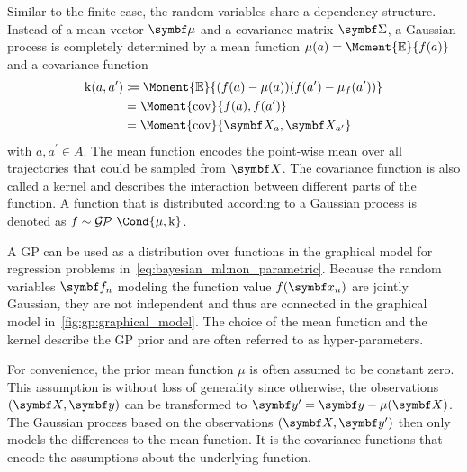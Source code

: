 Similar to the finite case, the random variables share a dependency structure.
Instead of a mean vector $\mat{\mu}$ and a covariance matrix $\mat{\Sigma}$, a Gaussian process is completely determined by a mean function $\mu(a) = \Moment{\E}{f(a)}$ and a covariance function
\begin{equation}
    \begin{split}
        \K(a, a^\prime) &\coloneqq \Moment{\E}{(f(a) - \mu(a))(f(a^\prime) - \mu_f(a^\prime))} \\
        &= \Moment{\cov}{f(a), f(a^\prime)} \\
        &= \Moment{\cov}{\rv{X}_a, \rv{X}_{a^\prime}}
    \end{split}
\end{equation}
with $a, a^\prime \in A$.
The mean function encodes the point-wise mean over all trajectories that could be sampled from $\rv{X}$.
The covariance function is also called a kernel and describes the interaction between different parts of the function.
A function that is distributed according to a Gaussian process is denoted as $f \sim \GP\Cond{\mu, \K}$.

A GP can be used as a distribution over functions in the graphical model for regression problems in~\cref{eq:bayesian_ml:non_parametric}.
Because the random variables $\mat{f}_n$ modeling the function value $f(\mat{x}_n)$ are jointly Gaussian, they are not independent and thus are connected in the graphical model in~\cref{fig:gp:graphical_model}.
The choice of the mean function
and the kernel
describe the GP prior and are often referred to as hyper-parameters.

For convenience, the prior mean function $\mu$ is often assumed to be constant zero.
This assumption is without loss of generality \cite{rasmussen_gaussian_2006} since otherwise, the observations $\left( \mat{X}, \mat{y} \right)$ can be transformed to $\mat{y^\prime} = \mat{y} - \mu(\mat{X})$.
The Gaussian process based on the observations $\left( \mat{X}, \mat{y^\prime} \right)$ then only models the differences to the mean function.
It is the covariance functions that encode the assumptions about the underlying function.

